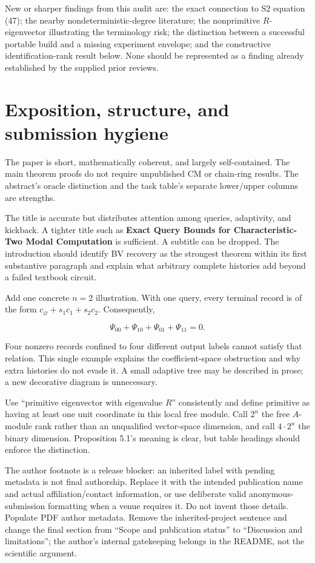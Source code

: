 \documentclass[
  11pt,
]{article}
\begin{document}
New or sharper findings from this audit are: the exact connection to S2
equation (47); the nearby nondeterministic-degree literature; the
nonprimitive \(R\)-eigenvector illustrating the terminology risk; the
distinction between a successful portable build and a missing experiment
envelope; and the constructive identification-rank result below. None
should be represented as a finding already established by the supplied
prior reviews.

\section{Exposition, structure, and submission
hygiene}\label{exposition-structure-and-submission-hygiene}

The paper is short, mathematically coherent, and largely self-contained.
The main theorem proofs do not require unpublished CM or chain-ring
results. The abstract's oracle distinction and the task table's separate
lower/upper columns are strengths.

The title is accurate but distributes attention among queries,
adaptivity, and kickback. A tighter title such as \textbf{Exact Query
Bounds for Characteristic-Two Modal Computation} is sufficient. A
subtitle can be dropped. The introduction should identify BV recovery as
the strongest theorem within its first substantive paragraph and explain
what arbitrary complete histories add beyond a failed textbook circuit.

Add one concrete \(n=2\) illustration. With one query, every terminal
record is of the form \(c_\varnothing+s_1c_1+s_2c_2\). Consequently,

\[
\Psi_{00}+\Psi_{10}+\Psi_{01}+\Psi_{11}=0.
\]

Four nonzero records confined to four different output labels cannot
satisfy that relation. This single example explains the
coefficient-space obstruction and why extra histories do not evade it. A
small adaptive tree may be described in prose; a new decorative diagram
is unnecessary.

Use ``primitive eigenvector with eigenvalue \(R\)'' consistently and
define primitive as having at least one unit coordinate in this local
free module. Call \(2^n\) the free \(A\)-module rank rather than an
unqualified vector-space dimension, and call \(4\cdot2^n\) the binary
dimension. Proposition 5.1's meaning is clear, but table headings should
enforce the distinction.

The author footnote is a release blocker: an inherited label with
pending metadata is not final authorship. Replace it with the intended
publication name and actual affiliation/contact information, or use
deliberate valid anonymous-submission formatting when a venue requires
it. Do not invent those details. Populate PDF author metadata. Remove
the inherited-project sentence and change the final section from ``Scope
and publication status'' to ``Discussion and limitations''; the author's
internal gatekeeping belongs in the README, not the scientific argument.
\end{document}

